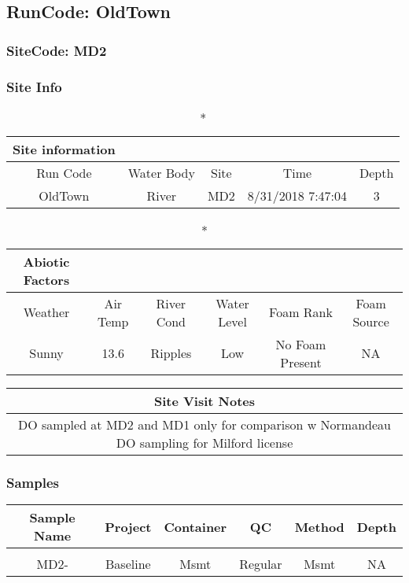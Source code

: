 \documentclass[
  letterpaper,
  DIV=11,
  numbers=noendperiod]{scrartcl}
\begin{document}
\hypertarget{runcode-oldtown-2}{%
\subsection{RunCode: OldTown}\label{runcode-oldtown-2}}

\hypertarget{sitecode-md2-1}{%
\subsubsection{SiteCode: MD2}\label{sitecode-md2-1}}

\subsubsection{Site Info}

\begin{longtable*}{ccccc}
\caption*{
{\large Site information}
} \\ 
\toprule
Run Code & Water Body & Site & Time & Depth \\ 
\midrule\addlinespace[2.5pt]
OldTown & River & MD2 & 8/31/2018 7:47:04 & 3 \\ 
\bottomrule
\end{longtable*}

\begin{longtable*}{cccccc}
\caption*{
{\large Abiotic Factors}
} \\ 
\toprule
Weather & Air Temp & River Cond & Water Level & Foam Rank & Foam Source \\ 
\midrule\addlinespace[2.5pt]
Sunny & 13.6 & Ripples & Low & No Foam Present & NA \\ 
\bottomrule
\end{longtable*}

\begin{longtable*}{c}
\toprule
Site Visit Notes \\ 
\midrule\addlinespace[2.5pt]
DO sampled at MD2 and MD1 only for comparison w Normandeau DO sampling for Milford license \\ 
\bottomrule
\end{longtable*}

\subsubsection{Samples}

\begin{longtable*}{cccccc}
\toprule
Sample Name & Project & Container & QC & Method & Depth \\ 
\midrule\addlinespace[2.5pt]
 \\ 
\midrule\addlinespace[2.5pt]
MD2- & Baseline & Msmt & Regular & Msmt & NA \\ 
\bottomrule
\end{longtable*}
\end{document}
